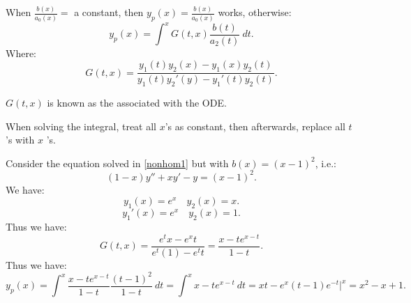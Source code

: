\documentclass[../main/main.tex]{subfiles}
\begin{document}
When $\frac{b(x)}{a_0(x)}=$ a  constant, then $y_p(x)=\frac{b(x)}{a_0(x)}$ works, otherwise: \[
	y_p(x) = \int^x G(t,x) \frac{b(t)}{a_2(t)}~dt
.\] Where: \[
G(t,x) = \frac{y_1(t)y_2(x)-y_1(x)y_2(t)}{y_1(t)y_2'(y)-y_1'(t)y_2(t)}
.\] 
\begin{remark}
	$G(t,x)$ is known as the  associated with the ODE.
\end{remark}
\begin{remark}
	When solving the integral, treat all $x$'s as constant, then afterwards, replace all $t$ 's with $x$ 's.
\end{remark}
\begin{example}
	Consider the equation solved in \ref{nonhom1} but with $b(x)=(x-1)^2$, i.e.:\[
	(1-x)y''+xy'-y=(x-1)^2
	.\]We have: \[
		y_1(x)=e^{x}\quad y_2(x) = x
	.\] 	\[
	y_1'(x) = e^{x} \quad y_2(x)= 1
	.\] Thus we have: \[
	G(t,x) = \frac{e^{t}x-e^{x}t}{e^{t}(1)-e^{t}t} = \frac{x-te^{x-t}}{1-t}
	.\] Thus we have: \[
	y_p(x) = \int^x \frac{x-t e^{x-t}}{1-t} \frac{(t-1)^2}{1-t}~dt = \int^x x-t e^{x-t}~dt = xt -e^{x}(t-1)e^{-t}\bigg\rvert^x = x^2-x+1
	.\] 
\end{example}
\end{document}
